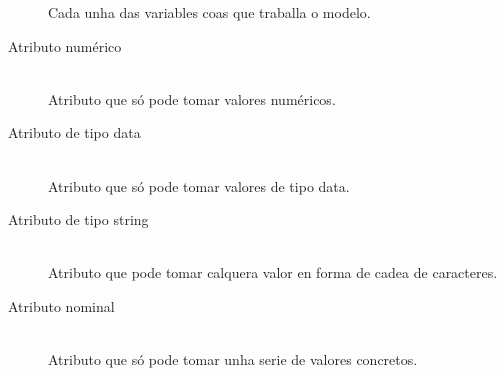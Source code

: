 \begin{description}
  Cada unha das variables coas que traballa o modelo.
	\item[Atributo numérico] \hfill \\
  Atributo que só pode tomar valores numéricos.
	\item[Atributo de tipo data] \hfill \\
  Atributo que só pode tomar valores de tipo data.
	\item[Atributo de tipo string] \hfill \\
  Atributo que pode tomar calquera valor en forma de cadea de caracteres.
	\item[Atributo nominal] \hfill \\
  Atributo que só pode tomar unha serie de valores concretos.
\end{description}